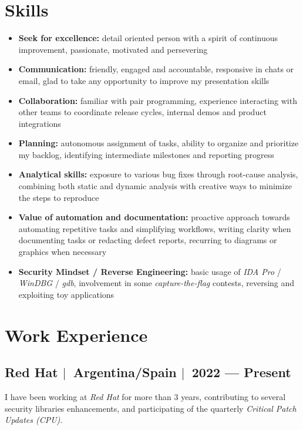 \documentclass[12pt, a4paper]{article}
\newcommand{\mysep}{{\Large $\mid$}\ }
\newcommand{\titledItem}[2]{\item \textbf{#1:} #2}
\newcommand{\timeFrame}[2]{{#1} --- {#2}}
\begin{document}
    \section*{Skills} \label{sec:skills}
    \begin{itemize}
        \titledItem{Seek for excellence}{%
            detail oriented person with a spirit of continuous improvement,
            passionate, motivated and persevering
        }
        \titledItem{Communication}{%
            friendly, engaged and accountable,
            responsive in chats or email,
            glad to take any opportunity to improve my presentation skills
        }
        \titledItem{Collaboration}{%
            familiar with pair programming,
            experience interacting with other teams to coordinate release cycles,
            internal demos and product integrations
        }
        \titledItem{Planning}{%
            autonomous assignment of tasks,
            ability to organize and prioritize my backlog,
            identifying intermediate milestones and reporting progress
        }
        \titledItem{Analytical skills}{%
            exposure to various bug fixes through root-cause analysis,
            combining both static and dynamic analysis with
            creative ways to minimize the steps to reproduce
        }
        \titledItem{Value of automation and documentation}{%
            proactive approach towards automating repetitive tasks and simplifying workflows,
            writing clarity when documenting tasks or redacting defect reports,
            recurring to diagrams or graphics when necessary
        }
        \titledItem{Security Mindset / Reverse Engineering}{%
            basic usage of \emph{IDA Pro} / \emph{WinDBG} / \emph{gdb},
            involvement in some \emph{capture-the-flag} contests,
            reversing and exploiting toy applications
        }
    \end{itemize}

    \section*{Work Experience} \label{sec:experience}

    \subsection*{Red Hat \mysep Argentina/Spain \mysep \timeFrame{2022}{Present}} \label{subsec:job1}
    I have been working at \emph{Red Hat} for more than 3 years,
    contributing to several security libraries enhancements,
    and participating of the quarterly \emph{Critical Patch Updates (CPU)}.
\end{document}
